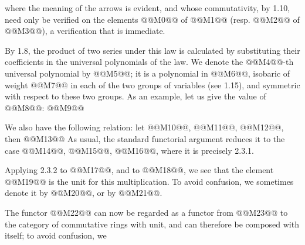 where the meaning of the arrows is evident, and whose commutativity, by 1.10, need only be verified on the elements @@M0@@ of @@M1@@ (resp. @@M2@@ of @@M3@@), a verification that is immediate.

By 1.8, the product of two series under this law is calculated by substituting their coefficients in the universal polynomials of the law. We denote the @@M4@@-th universal polynomial by @@M5@@; it is a polynomial in @@M6@@, isobaric of weight @@M7@@ in each of the two groups of variables (see 1.15), and symmetric with respect to these two groups. As an example, let us give the value of @@M8@@:
@@M9@@

We also have the following relation: let @@M10@@, @@M11@@, @@M12@@, then
@@M13@@
As usual, the standard functorial argument reduces it to the case @@M14@@, @@M15@@, @@M16@@, where it is precisely 2.3.1.

Applying 2.3.2 to @@M17@@, and to @@M18@@, we see that the element @@M19@@ is the unit for this multiplication. To avoid confusion, we sometimes denote it by @@M20@@, or by @@M21@@.

The functor @@M22@@ can now be regarded as a functor from @@M23@@ to the category of commutative rings with unit, and can therefore be composed with itself; to avoid confusion,
we

